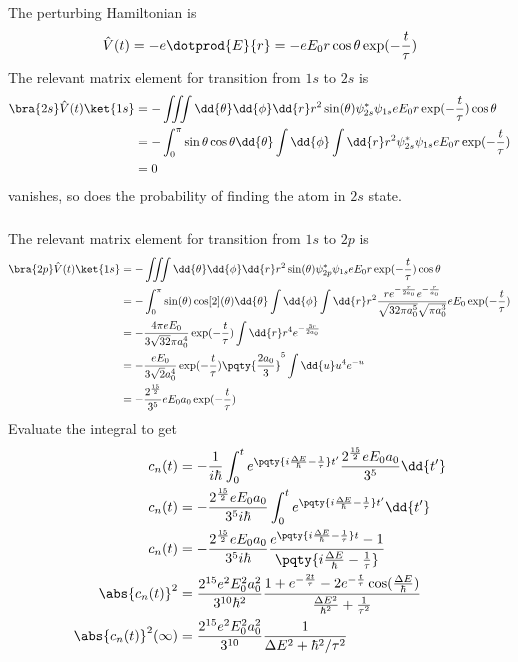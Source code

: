 \documentclass[12pt]{article}
\begin{document}
        \subsubsection{} The perturbing Hamiltonian is \[
            \hat{V}(t) = - e \dotprod{E}{r} = - eE_0 r\cos\theta\exp( - \frac{t}{\tau})
        \]
        The relevant matrix element for transition from \(1s\) to \(2s\) is \begin{align*}
            \bra{2s} \hat{V}(t) \ket{1s} &= -\iiint \dd{\theta} \dd{\phi}\dd{r} r^2 \sin(\theta) \psi_{2s}^* \psi_{1s} eE_0r\exp( - \frac{t}{\tau})\cos\theta\\
            &= -\int_0^{\pi} \sin\theta \cos\theta \dd{\theta} \int \dd{\phi} \int \dd{r} r^2  \psi_{2s}^* \psi_{1s} eE_0r\exp( - \frac{t}{\tau}) \\
            &= 0
        \end{align*}
        vanishes, so does the probability of finding the atom in \(2s\) state.
        \subsubsection{} The relevant matrix element for transition from \(1s\) to \(2p\) is \begin{align*}
            \bra{2p} \hat{V}(t) \ket{1s} &= -\iiint \dd{\theta} \dd{\phi}\dd{r} r^2 \sin(\theta) \psi_{2p}^* \psi_{1s} eE_0r\exp( - \frac{t}{\tau})\cos\theta\\
            &=  -\int_0^{\pi} \sin(\theta) \cos[2](\theta) \dd{\theta} \int \dd{\phi} \int \dd{r} r^2 \frac{re^{ - \frac{r}{2a_0}}e^{ - \frac{r}{a_0}}}{\sqrt{32\pi a_0^5}\sqrt{\pi a_0^3}}  eE_0\exp( - \frac{t}{\tau}) \\
            &=  - \frac{4\pi eE_0}{3 \sqrt{32} \pi a_0^4} \exp( - \frac{t}{\tau})  \int \dd{r} r^4 e^{ - \frac{3r}{2a_0}} \\
            &=  - \frac{eE_0}{3 \sqrt{2} a_0^4} \exp( - \frac{t}{\tau}) \pqty{\frac{2a_0}{3}}^5 \int \dd{u} u^4 e^{ - u} \\
            &=  - \frac{2^{\frac{15}{2}}}{3^5}eE_0 a_0 \exp( - \frac{t}{\tau})  
        \end{align*}
        Evaluate the integral to get
        \begin{align*}
            c_n(t) &= - \frac{1}{i\hbar} \int_0^t e^{\pqty{i\frac{\Delta E}{\hbar} - \frac{1}{\tau}}t'} \frac{2^{\frac{15}{2}}eE_0 a_0 }{3^5}\dd{t'}\\
            c_n(t) &= - \frac{2^{\frac{15}{2}}eE_0 a_0 }{3^5 i\hbar} \int_0^t e^{\pqty{i\frac{\Delta E}{\hbar} - \frac{1}{\tau}}t'}  \dd{t'}\\
            c_n(t) &= - \frac{2^{\frac{15}{2}}eE_0 a_0 }{3^5 i\hbar} \frac{e^{\pqty{i\frac{\Delta E}{\hbar} - \frac{1}{\tau}}t} - 1}{\pqty{i\frac{\Delta E}{\hbar} - \frac{1}{\tau}}} \\
            \abs{c_n(t)}^2 &= \frac{2^{15} e^2E^2_0 a_0^2}{3^{10}\hbar^2} \frac{1 + e^{ - \frac{2t}{\tau}} - 2e^{ -\frac{t}{\tau}} \cos(\frac{\Delta E}{\hbar})}{\frac{\Delta E^2}{\hbar^2} + \frac{1}{\tau^2}}\\
            \abs{c_n(t)}^2 (\infty) &= \frac{2^{15} e^2E^2_0 a_0^2}{3^{10}} \frac{1}{\Delta E^2 + \hbar^2 / \tau^2}
        \end{align*}
\end{document}

